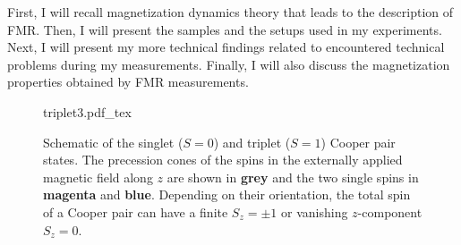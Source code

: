 First, I will recall magnetization dynamics theory that leads to the description of FMR.  Then, I will present the samples and the setups used in my experiments. Next, I will present my more technical findings related to encountered technical problems during my measurements. Finally, I will also discuss the magnetization properties obtained by FMR measurements.

\begin{figure}[b]
    \centering
    \vspace{-2mm}
    {triplet3.pdf_tex}
    \vspace{-2mm}
    \caption[Scheme of singlet and triplet Cooper pair states]{Schematic of the singlet ($S=0$) and triplet ($S=1$) Cooper pair states. The precession cones of the spins in the externally applied magnetic field along $z$ are shown in \textbf{\color[rgb]{0.5276,0.5276,0.5276}grey} and the two single spins in \textbf{\color{antiseeblau100}magenta} and \textbf{\color{seeblau100}blue}. Depending on their orientation, the total spin of a Cooper pair can have a finite $S_z=\pm 1$ or vanishing $z$-component $S_z=0$. \cite{eschrig2015}}
    \label{fig:intro_triplet}
\end{figure}